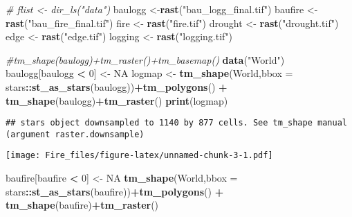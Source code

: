 \documentclass[
]{article}
\newenvironment{Shaded}{\begin{snugshade}}{\end{snugshade}}
\newcommand{\AttributeTok}[1]{\textcolor[rgb]{0.13,0.29,0.53}{#1}}
\newcommand{\CommentTok}[1]{\textcolor[rgb]{0.56,0.35,0.01}{\textit{#1}}}
\newcommand{\ConstantTok}[1]{\textcolor[rgb]{0.56,0.35,0.01}{#1}}
\newcommand{\DecValTok}[1]{\textcolor[rgb]{0.00,0.00,0.81}{#1}}
\newcommand{\FunctionTok}[1]{\textcolor[rgb]{0.13,0.29,0.53}{\textbf{#1}}}
\newcommand{\NormalTok}[1]{#1}
\newcommand{\OtherTok}[1]{\textcolor[rgb]{0.56,0.35,0.01}{#1}}
\newcommand{\SpecialCharTok}[1]{\textcolor[rgb]{0.81,0.36,0.00}{\textbf{#1}}}
\newcommand{\StringTok}[1]{\textcolor[rgb]{0.31,0.60,0.02}{#1}}
\begin{document}
\begin{Shaded}
\begin{Highlighting}[]
\CommentTok{\# flist \textless{}{-} dir\_ls("data")}
\NormalTok{baulogg }\OtherTok{\textless{}{-}}\FunctionTok{rast}\NormalTok{(}\StringTok{"bau\_logg\_final.tif"}\NormalTok{) }
\NormalTok{baufire }\OtherTok{\textless{}{-}}\FunctionTok{rast}\NormalTok{(}\StringTok{"bau\_fire\_final.tif"}\NormalTok{)}
\NormalTok{fire }\OtherTok{\textless{}{-}} \FunctionTok{rast}\NormalTok{(}\StringTok{"fire.tif"}\NormalTok{)}
\NormalTok{drought }\OtherTok{\textless{}{-}} \FunctionTok{rast}\NormalTok{(}\StringTok{"drought.tif"}\NormalTok{)}
\NormalTok{edge }\OtherTok{\textless{}{-}} \FunctionTok{rast}\NormalTok{(}\StringTok{"edge.tif"}\NormalTok{)}
\NormalTok{logging }\OtherTok{\textless{}{-}} \FunctionTok{rast}\NormalTok{(}\StringTok{"logging.tif"}\NormalTok{)}
\end{Highlighting}
\end{Shaded}

\begin{Shaded}
\begin{Highlighting}[]
\CommentTok{\#tm\_shape(baulogg)+tm\_raster()+tm\_basemap()}
\FunctionTok{data}\NormalTok{(}\StringTok{"World"}\NormalTok{)}
\NormalTok{baulogg[baulogg }\SpecialCharTok{\textless{}} \DecValTok{0}\NormalTok{] }\OtherTok{\textless{}{-}} \ConstantTok{NA}
\NormalTok{logmap }\OtherTok{\textless{}{-}} \FunctionTok{tm\_shape}\NormalTok{(World,}\AttributeTok{bbox =}\NormalTok{ stars}\SpecialCharTok{::}\FunctionTok{st\_as\_stars}\NormalTok{(baulogg))}\SpecialCharTok{+}\FunctionTok{tm\_polygons}\NormalTok{() }\SpecialCharTok{+}
  \FunctionTok{tm\_shape}\NormalTok{(baulogg)}\SpecialCharTok{+}\FunctionTok{tm\_raster}\NormalTok{()}
\FunctionTok{print}\NormalTok{(logmap)}
\end{Highlighting}
\end{Shaded}

\begin{verbatim}
## stars object downsampled to 1140 by 877 cells. See tm_shape manual (argument raster.downsample)
\end{verbatim}

\texttt{[image: Fire\_files/figure-latex/unnamed-chunk-3-1.pdf]}

\begin{Shaded}
\begin{Highlighting}[]
\NormalTok{baufire[baufire }\SpecialCharTok{\textless{}} \DecValTok{0}\NormalTok{] }\OtherTok{\textless{}{-}} \ConstantTok{NA}
\FunctionTok{tm\_shape}\NormalTok{(World,}\AttributeTok{bbox =}\NormalTok{ stars}\SpecialCharTok{::}\FunctionTok{st\_as\_stars}\NormalTok{(baufire))}\SpecialCharTok{+}\FunctionTok{tm\_polygons}\NormalTok{() }\SpecialCharTok{+}
  \FunctionTok{tm\_shape}\NormalTok{(baufire)}\SpecialCharTok{+}\FunctionTok{tm\_raster}\NormalTok{()}
\end{Highlighting}
\end{Shaded}
\end{document}
